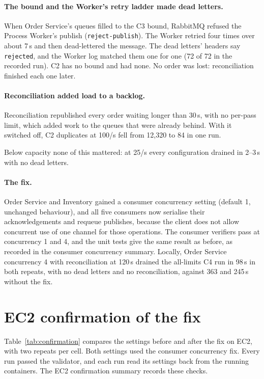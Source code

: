 \documentclass[a4paper]{report}
\begin{document}
\paragraph{The bound and the Worker's retry ladder made dead letters.} When
Order Service's queues filled to the C3 bound, RabbitMQ refused the Process
Worker's publish (\texttt{reject-publish}). The Worker retried four times over
about 7\,s and then dead-lettered the message. The dead letters' headers say
\texttt{rejected}, and the Worker log matched them one for one (72 of 72 in the
recorded run). C2 has no bound and had none. No order was lost: reconciliation
finished each one later.

\paragraph{Reconciliation added load to a backlog.} Reconciliation republished
every order waiting longer than 30\,s, with no per-pass limit, which added work
to the queues that were already behind. With it switched off, C2 duplicates at
100/s fell from 12,320 to 84 in one run.

Below capacity none of this mattered: at 25/s every configuration drained in
2--3\,s with no dead letters.

\paragraph{The fix.} Order Service and Inventory gained a consumer concurrency
setting (default 1, unchanged behaviour), and all five consumers now serialise
their acknowledgements and requeue publishes, because the client does not allow
concurrent use of one channel for those operations. The consumer verifiers pass
at concurrency 1 and 4, and the unit tests give the same result as before,
as recorded in the consumer concurrency summary.
Locally, Order Service concurrency 4 with
reconciliation at 120\,s drained the all-limits C4 run in 98\,s in both repeats,
with no dead letters and no reconciliation, against 363 and 245\,s without the
fix.


\section{EC2 confirmation of the fix}
\label{sec:confirmation}

Table~\ref{tab:confirmation} compares the settings before and after the fix on
EC2, with two repeats per cell. Both settings used the consumer concurrency fix. Every run passed the
validator, and each run read its settings back from the running containers.
The EC2 confirmation summary records these checks.
\end{document}
